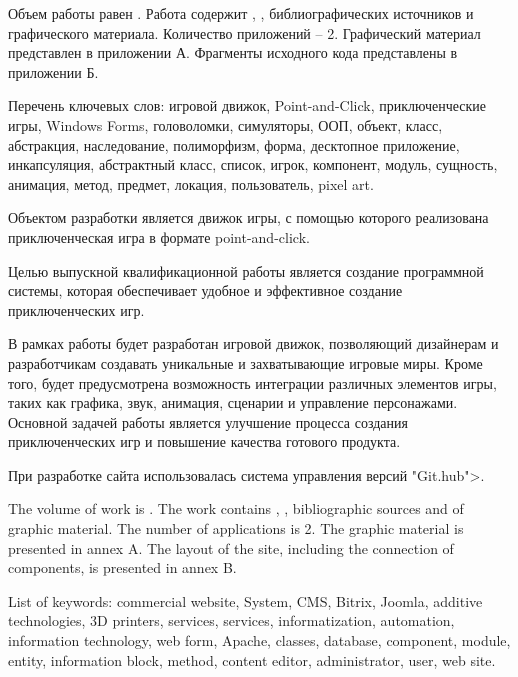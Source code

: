 
Объем работы равен . Работа содержит , ,  библиографических источников и  графического материала. Количество приложений – 2. Графический материал представлен в приложении А. Фрагменты исходного кода представлены в приложении Б.

Перечень ключевых слов: игровой движок, Point-and-Click, приключенческие игры, Windows Forms, головоломки, симуляторы, ООП, объект, класс, абстракция, наследование, полиморфизм, форма, десктопное приложение, инкапсуляция, абстрактный класс, список, игрок, компонент, модуль, сущность, анимация, метод, предмет, локация, пользователь, pixel art.

Объектом разработки является движок игры, с помощью которого реализована приключенческая игра в формате point-and-click.

Целью выпускной квалификационной работы является создание программной системы, которая обеспечивает удобное и эффективное создание приключенческих игр.

В рамках работы будет разработан игровой движок, позволяющий дизайнерам и разработчикам создавать уникальные и захватывающие игровые миры. Кроме того, будет предусмотрена возможность интеграции различных элементов игры, таких как графика, звук, анимация, сценарии и управление персонажами. Основной задачей работы является улучшение процесса создания приключенческих игр и повышение качества готового продукта.

При разработке сайта использовалась система управления версий "Git.hub">.

  
The volume of work is . The work contains , ,  bibliographic sources and  of graphic material. The number of applications is 2. The graphic material is presented in annex A. The layout of the site, including the connection of components, is presented in annex B.

List of keywords: commercial website, System, CMS, Bitrix, Joomla, additive technologies, 3D printers, services, services, informatization, automation, information technology, web form, Apache, classes, database, component, module, entity, information block, method, content editor, administrator, user, web site.

